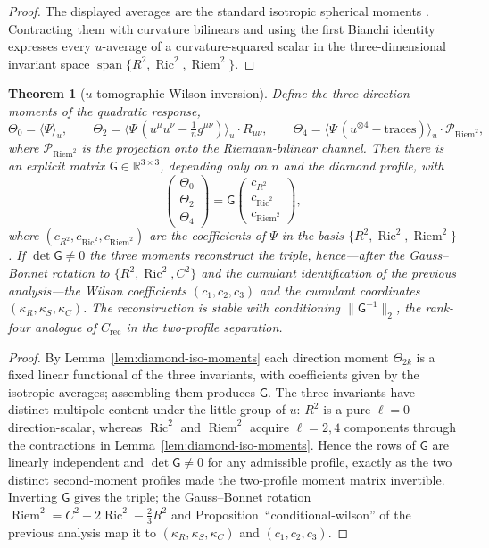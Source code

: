 \documentclass[11pt]{article}
\newtheorem{theorem}{Theorem}[section]
\theoremstyle{definition}
\theoremstyle{remark}
\newcommand{\R}{\mathbb R}
\newcommand{\Ric}{\operatorname{Ric}}
\newcommand{\Riem}{\operatorname{Riem}}
\newcommand{\Weyl}{C}
\newcommand{\kR}{\kappa_R}
\newcommand{\kS}{\kappa_S}
\newcommand{\kC}{\kappa_C}
\DeclareMathOperator{\spn}{span}
\begin{document}
\begin{proof}
The displayed averages are the standard isotropic spherical moments
\cite{Vassilevich}.  Contracting them with curvature bilinears and using the
first Bianchi identity expresses every $u$-average of a curvature-squared scalar
in the three-dimensional invariant space $\spn\{R^2,\Ric^2,\Riem^2\}$.
\end{proof}

\begin{theorem}[$u$-tomographic Wilson inversion]
\label{thm:u-tomography}
Define the three direction moments of the quadratic response,
\[
 \Theta_0=\langle\Psi\rangle_u,\qquad
 \Theta_2=\bigl\langle\Psi\,(u^\mu u^\nu-\tfrac1n g^{\mu\nu})\bigr\rangle_u
          \!\cdot\! R_{\mu\nu},\qquad
 \Theta_4=\bigl\langle\Psi\,(u^{\otimes4}-\mathrm{traces})\bigr\rangle_u
          \!\cdot\! \mathcal P_{\Riem^2},
\]
where $\mathcal P_{\Riem^2}$ is the projection onto the Riemann-bilinear channel.
Then there is an explicit matrix $\mathsf G\in\R^{3\times3}$, depending only on
$n$ and the diamond profile, with
\[
 \begin{pmatrix}\Theta_0\\\Theta_2\\\Theta_4\end{pmatrix}
 =\mathsf G
 \begin{pmatrix} c_{R^2}\\ c_{\Ric^2}\\ c_{\Riem^2}\end{pmatrix},
\]
where $(c_{R^2},c_{\Ric^2},c_{\Riem^2})$ are the coefficients of $\Psi$ in the
basis $\{R^2,\Ric^2,\Riem^2\}$.  If $\det\mathsf G\neq0$ the three moments
reconstruct the triple, hence---after the Gauss--Bonnet rotation to
$\{R^2,\Ric^2,\Weyl^2\}$ and the cumulant identification of the previous analysis---the
Wilson coefficients $(c_1,c_2,c_3)$ and the cumulant coordinates
$(\kR,\kS,\kC)$.  The reconstruction is stable with conditioning
$\|\mathsf G^{-1}\|_2$, the rank-four analogue of $C_{\mathrm{rec}}$ in the
two-profile separation.
\end{theorem}

\begin{proof}
By Lemma~\ref{lem:diamond-iso-moments} each direction moment $\Theta_{2k}$ is a fixed
linear functional of the three invariants, with coefficients given by the
isotropic averages; assembling them produces $\mathsf G$.  The three invariants
have distinct multipole content under the little group of $u$: $R^2$ is a pure
$\ell=0$ direction-scalar, whereas $\Ric^2$ and $\Riem^2$ acquire $\ell=2,4$
components through the contractions in Lemma~\ref{lem:diamond-iso-moments}.  Hence the
rows of $\mathsf G$ are linearly independent and $\det\mathsf G\neq0$ for any
admissible profile, exactly as the two distinct second-moment profiles made the
two-profile moment matrix invertible.  Inverting $\mathsf G$ gives the triple;
the Gauss--Bonnet rotation $\Riem^2=\Weyl^2+2\Ric^2-\tfrac23R^2$ and
Proposition~``conditional-wilson'' of the previous analysis map it to
$(\kR,\kS,\kC)$ and $(c_1,c_2,c_3)$.
\end{proof}
\end{document}
